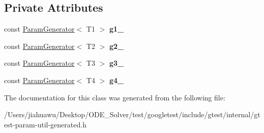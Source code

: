 \subsection*{Private Attributes}
\begin{DoxyCompactItemize}
\item 
\mbox{\label{classtesting_1_1internal_1_1_cartesian_product_generator4_a916a14456616d2be5f7c0185d6917aeb}} 
const \mbox{\hyperlink{classtesting_1_1internal_1_1_param_generator}{Param\+Generator}}$<$ T1 $>$ {\bfseries g1\+\_\+}
\item 
\mbox{\label{classtesting_1_1internal_1_1_cartesian_product_generator4_aa54ef550ea4f6daa98177faee4cab9fb}} 
const \mbox{\hyperlink{classtesting_1_1internal_1_1_param_generator}{Param\+Generator}}$<$ T2 $>$ {\bfseries g2\+\_\+}
\item 
\mbox{\label{classtesting_1_1internal_1_1_cartesian_product_generator4_a8b76a441b940b79dc96ce0d5ae30c70b}} 
const \mbox{\hyperlink{classtesting_1_1internal_1_1_param_generator}{Param\+Generator}}$<$ T3 $>$ {\bfseries g3\+\_\+}
\item 
\mbox{\label{classtesting_1_1internal_1_1_cartesian_product_generator4_ac9de33013a5030a368c30bd4029beea1}} 
const \mbox{\hyperlink{classtesting_1_1internal_1_1_param_generator}{Param\+Generator}}$<$ T4 $>$ {\bfseries g4\+\_\+}
\end{DoxyCompactItemize}


The documentation for this class was generated from the following file\+:\begin{DoxyCompactItemize}
\item 
/\+Users/jiahuawu/\+Desktop/\+O\+D\+E\+\_\+\+Solver/test/googletest/include/gtest/internal/gtest-\/param-\/util-\/generated.\+h\end{DoxyCompactItemize}
